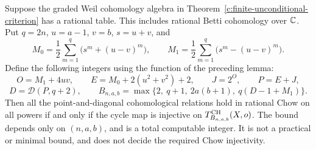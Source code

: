\begin{corollary}
\label{c:uniform-arity-bound}
Suppose the graded Weil cohomology algebra in
Theorem~\ref{c:finite-unconditional-criterion} has a rational
table.  This includes rational Betti cohomology over $\mathbb C$.
Put $q=2n$, $u=a-1$, $v=b$, $s=u+v$, and
\[
 M_0=\frac12\sum_{m=1}^{q}\bigl(s^m+(u-v)^m\bigr),\qquad
 M_1=\frac12\sum_{m=1}^{q}\bigl(s^m-(u-v)^m\bigr).
\]
Define the following integers using the function of the preceding
lemma:
\[
 O=M_1+4uv,\qquad
 E=M_0+2(u^2+v^2)+2,\qquad
 J=2^O,\qquad P=E+J,
\]
\[
 D=\mathcal D(P,q+2),\qquad
 B_{n,a,b}=\max\{2,\ q+1,\ 2a(b+1),\ q(D-1+M_1)\}.
\]
Then all the point-and-diagonal cohomological relations hold in
rational Chow on all powers if and only if the cycle map is
injective on $T_{B_{n,a,b}}^{\operatorname{CH}}(X,o)$.
The bound depends only on $(n,a,b)$, and is a total computable
integer.  It is not a practical or minimal bound, and does not
decide the required Chow injectivity.
\end{corollary}

